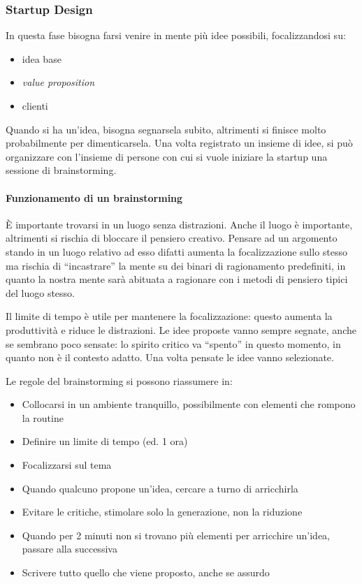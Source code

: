 \subsubsection{Startup Design}

In questa fase bisogna farsi venire in mente più idee possibili, focalizzandosi
su:
\begin{itemize}
 \item idea base
 \item \textit{value proposition}
 \item clienti
\end{itemize}

Quando si ha un'idea, bisogna segnarsela subito, altrimenti si finisce molto
probabilmente per dimenticarsela. Una volta registrato un insieme di idee, si
può organizzare con l'insieme di persone con cui si vuole iniziare la startup
una sessione di brainstorming.

\paragraph*{Funzionamento di un brainstorming} È importante trovarsi in un
luogo senza distrazioni. Anche il luogo è importante, altrimenti si rischia di
bloccare il pensiero creativo. Pensare ad un argomento stando in un luogo
relativo ad esso difatti aumenta la focalizzazione sullo stesso ma rischia di
``incastrare'' la mente su dei binari di ragionamento predefiniti, in quanto la
nostra mente sarà abituata a ragionare con i metodi di pensiero tipici del
luogo stesso.

Il limite di tempo è utile per mantenere la focalizzazione: questo aumenta la
produttività e riduce le distrazioni. Le idee proposte vanno sempre segnate,
anche se sembrano poco sensate: lo spirito critico va ``spento'' in questo
momento, in quanto non è il contesto adatto.
Una volta pensate le idee vanno selezionate.

Le regole del brainstorming si possono riassumere in:

\begin{itemize}
 \item Collocarsi in un ambiente tranquillo, possibilmente con elementi che
rompono la routine
 \item Definire un limite di tempo (ed. 1 ora)
 \item Focalizzarsi sul tema
 \item Quando qualcuno propone un'idea, cercare a turno di arricchirla
 \item Evitare le critiche, stimolare solo la generazione, non la riduzione
 \item Quando per 2 minuti non si trovano più elementi per arricchire un'idea,
passare alla successiva
 \item Scrivere tutto quello che viene proposto, anche se assurdo 
\end{itemize}

